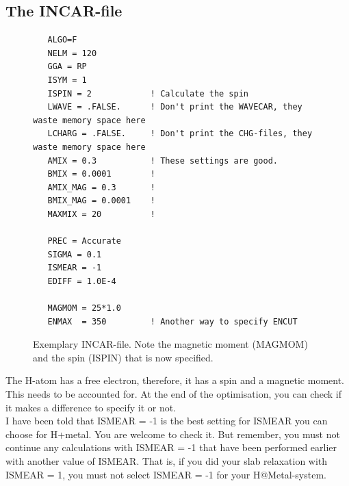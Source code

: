 \documentclass[twoside, 11pt, titlepage, captions=nooneline, a4paper, headsepline]{scrbook}%
\newcommand{\9}{\mathrm}
\newcommand{\0}{\,\mathrm}
\begin{document}
\subsection{The INCAR-file}
\begin{figure}[h!!]
\begin{verbatim}
   ALGO=F
   NELM = 120
   GGA = RP
   ISYM = 1
   ISPIN = 2			! Calculate the spin
   LWAVE = .FALSE.		! Don't print the WAVECAR, they waste memory space here
   LCHARG = .FALSE.		! Don't print the CHG-files, they waste memory space here
   AMIX = 0.3			! These settings are good.
   BMIX = 0.0001		!
   AMIX_MAG = 0.3		!
   BMIX_MAG = 0.0001	!
   MAXMIX = 20			!

   PREC = Accurate
   SIGMA = 0.1
   ISMEAR = -1
   EDIFF = 1.0E-4

   MAGMOM = 25*1.0
   ENMAX  = 350			! Another way to specify ENCUT
\end{verbatim}
\caption{Exemplary INCAR-file. Note the magnetic moment (MAGMOM) and the spin (ISPIN) that is now specified.}
\label{cin}
\end{figure}
The H-atom has a free electron, therefore, it has a spin and a magnetic moment. This needs to be accounted for. At the end of the optimisation, you can check if it makes a difference to specify it or not.\\
I have been told that ISMEAR = -1 is the best setting for ISMEAR you can choose for H+metal. You are welcome to check it. But remember, you must not continue any calculations with ISMEAR = -1 that have been performed earlier with another value of ISMEAR. That is, if you did your slab relaxation with ISMEAR = 1, you must not select ISMEAR = -1 for your H@Metal-system.\\
\end{document}
